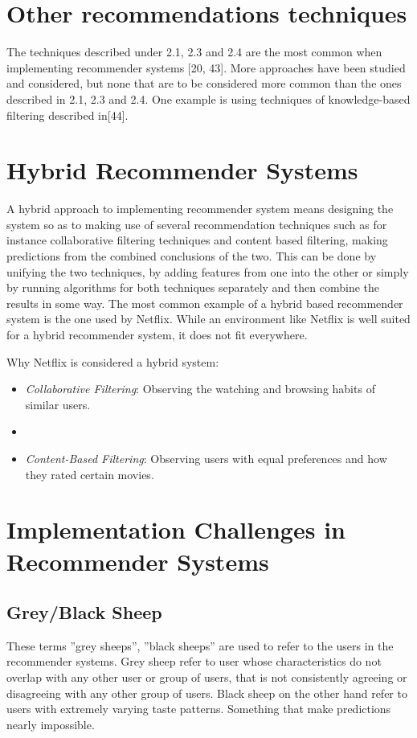 \section{Other recommendations techniques}
The techniques described under 2.1, 2.3 and 2.4 are the most common when implementing recommender systems [20, 43]. More approaches have been studied and considered, but none that are to be considered more common than the ones described in 2.1, 2.3 and 2.4. One example is using techniques of knowledge-based filtering described in[44].

\section{Hybrid Recommender Systems}
A hybrid approach to implementing recommender system means designing the system so as to making use of several recommendation techniques such as for instance collaborative filtering techniques and content based filtering, making predictions from the combined conclusions of the two. This can be done by unifying the two techniques, by adding features from one into the other or simply by running algorithms for both techniques separately and then combine the results in some way. The most common example of a hybrid based recommender system is the one used by Netflix. While an environment like Netflix is well suited for a hybrid recommender system, it does not fit everywhere.

Why Netflix is considered a hybrid system:

\begin{itemize}
	\item {\textit{Collaborative Filtering}: Observing the watching and browsing habits of similar users.}
\item \blindtext
\item {\textit{Content-Based Filtering}: Observing users with equal preferences and how they rated certain movies.}

\end{itemize}

\section{Implementation Challenges in Recommender Systems}

\subsection{Grey/Black Sheep}
These terms ”grey sheeps”, ”black sheeps” are used to refer to the users in the recommender systems. Grey sheep refer to user whose characteristics do not overlap with any other user or group of users, that is not consistently agreeing or disagreeing with any other group of users. Black sheep on the other hand refer to users with extremely varying taste patterns. Something that make predictions nearly impossible.

